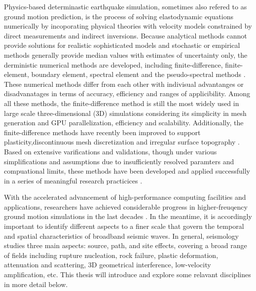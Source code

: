 Physics-based determinastic earthquake simulation, sometimes also refered to as ground motion prediction, is the process of solving elastodynamic equations numerically by incoporating physical theories with velocity models constrained by direct measurements and indirect inversions. Because analytical methods cannot provide solutions for realistic sophisticated models and stochastic or empirical methods generally provide median values with estimates of uncertainty only, the derministic numerical methods are developed, including finite-difference, finite-element, boundary element, spectral element and the pseudo-spectral methods . These numerical methods differ from each other with indivisual advantanges or disadvanatages in terms of accuracy, efficiency and ranges of applicibility. Among all these methods, the finite-difference method is still the most widely used in large scale three-dimensional (3D) simulations considering its simplicity in mesh generation and GPU parallelization, efficiency and scalability. Additionally, the finite-difference methods have recently been improved to support plasticity,discontinuous mesh discretization and irregular surface topography . Based on extensive varifications and validations, though under various simplifications and assumptions due to insufficiently resolved paramters and compuational limits, these methods have been developed and applied successfully in a series of meaningful research practicices \citep[e.g., ShakeOut, PetaShake, M9 Cascadia; for more details readers are referred to ][]{cuiPetascaleEarthquakeSimulations2009,cuiTeraShakeComputationalPlatform2009,olsen2009shakeout,marafiImpactsSimulatedM92019}.

With the accelerated advancement of high-performance computing facilities and applications, researchers have achieved considerable progress in higher-freuqency ground motion simulations in the last decades \citep{gravesBroadbandSimulationsSouthern2008,olsen2009shakeout,bielakShakeOutEarthquakeScenario2010,roten3DSimulationsEarthquakes2012, savranGroundMotionSimulation2019,withersGroundMotionIntraevent2019}. In the meantime, it is accordingly important to identify different aspects to a finer scale that govern the temporal and spatial characteristics of broadband seismic waves. In general, seismology studies three main aspects: source, path, and site effects, covering a broad range of fields including rupture nucleation, rock failure, plastic deformation, attenuation and scattering, 3D geometrical interference, low-velocity amplification, etc. This thesis will introduce and explore some relavant disciplines in more detail below.


